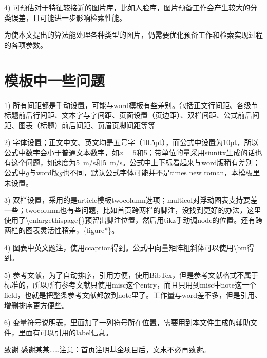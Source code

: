 \documentclass[10.5pt,twocolumn]{jthu-st}
\newcommand\mycolorRed[1]{{\color{red}#1}}
\begin{document}
4) 可预估对于特征较接近的图片库，比如人脸库，图片预备工作会产生较大的分类误差，且可能进一步影响检索性能。

为使本文提出的算法能处理各种类型的图片，仍需要优化预备工作和检索实现过程的各项参数。


\section{\mycolorRed{模板中一些问题}}

1) 所有\mycolorRed{间距}都是手动设置，可能与word模板有些差别。包括正文行间距、各级节标题前后行间距、文本字与字间距、页面设置（页边距）、双栏间距、公式前后间距、图表（标题）前后间距、页眉页脚间距等等

2) \mycolorRed{字体}设置；正文中文、英文均是五号字（10.5pt），而公式中设置为10pt，所以公式中数字会小于普通文本数字，如$x=5$和5；带单位的量采用siunitx生成的话也有这个问题，如速度为\SI{5}{m/s}和5\ m/s。公式中上下标看起来与word版稍有差别；公式中$g$与word版\textit{g}也不同，默认公式字体可能并不是times new roman，本模板里未设置。

3) \mycolorRed{双栏}设置，采用的是article模板twocolumn选项；multicol对浮动图表支持要差一些；twocolumn也有些问题，比如首页跨两栏的脚注，没找到更好的办法，这里使用了\textbackslash enlargethispage\{\}预留出脚注位置，然后用tikz手动调node的位置。还有跨两栏的图表灵活性稍差，\{figure*\}。

4) 图表中英文题注，使用ccaption得到。公式中向量矩阵粗斜体可以使用\textbackslash bm得到。

5) 参考文献，为了自动排序，引用方便，使用BibTex，但是参考文献格式不属于标准的，所以所有参考文献只使用misc这个entry，而且只用到misc中note这一个field，也就是把整条参考文献都放到note里了。工作量与word差不多，但是引用、增删排序更方便些。

6) 变量符号说明表，里面加了一列符号所在位置，需要用到本文件生成的辅助文件，里面有可以引用的label信息。


\vspace{1em}
{\hei\wuhao 致谢\quad}
{\fang\wuhao 
感谢某某……注意：首页注明基金项目后，文末不必再致谢。
}




\renewcommand\refname{\hei\wuhao\centerline{参考文献（References）}\global\def\refname{参考文献}}
\vskip 12pt

\let\OLDthebibliography\thebibliography
\renewcommand\thebibliography[1]{
  \OLDthebibliography{#1}
  \setlength{\parskip}{0pt}
  \setlength{\itemsep}{0pt plus 0.3ex}
}
\end{document}
